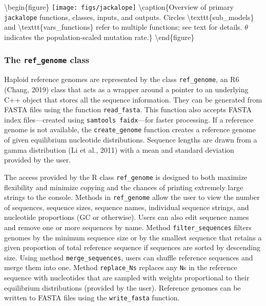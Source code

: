 \documentclass[12pt,]{article}
\begin{document}
\textbackslash{}begin\{figure\}
\texttt{[image: figs/jackalope]} \textbackslash{}caption\{Overview of primary \texttt{jackalope} functions, classes, inputs, and outputs. Circles \textbackslash{}texttt\{sub\_models\} and \textbackslash{}texttt\{vars\_functions\} refer to multiple functions; see text for details. \(\theta\) indicates the population-scaled mutation rate.\}\label{fig:jackalope-overview-figure}
\textbackslash{}end\{figure\}

\hypertarget{the-ref_genome-class}{%
\subsubsection{\texorpdfstring{The \texttt{ref\_genome} class}{The ref\_genome class}}\label{the-ref_genome-class}}

Haploid reference genomes are represented by the class \texttt{ref\_genome}, an
R6 (Chang, 2019) class that acts as a wrapper around a pointer to
an underlying C++ object that stores all the sequence information.
They can be generated from FASTA files using the function \texttt{read\_fasta}.
This function also accepts FASTA index files---created using
\texttt{samtools\ faidx}---for faster processing.
If a reference genome is not available, the \texttt{create\_genome} function creates
a reference genome of given equilibrium nucleotide distributions.
Sequence lengths are drawn from a gamma distribution (Li et al., 2011)
with a mean and standard deviation provided by the user.

The access provided by the R class \texttt{ref\_genome} is designed to both
maximize flexibility and minimize copying and the chances of
printing extremely large strings to the console.
Methods in \texttt{ref\_genome} allow the user to view the
number of sequences, sequence sizes, sequence names, individual sequence strings,
and nucleotide proportions (GC or otherwise).
Users can also edit sequence names and remove one or more sequences by name.
Method \texttt{filter\_sequences} filters genomes by the minimum sequence size or
by the smallest sequence that retains a given proportion of total reference
sequence if sequences are sorted by descending size.
Using method \texttt{merge\_sequences}, users can shuffle reference sequences and
merge them into one.
Method \texttt{replace\_Ns} replaces any \texttt{N}s in the reference sequence with nucleotides
that are sampled with weights proportional to their equilibrium distributions
(provided by the user).
Reference genomes can be written to FASTA files using the \texttt{write\_fasta} function.
\end{document}
